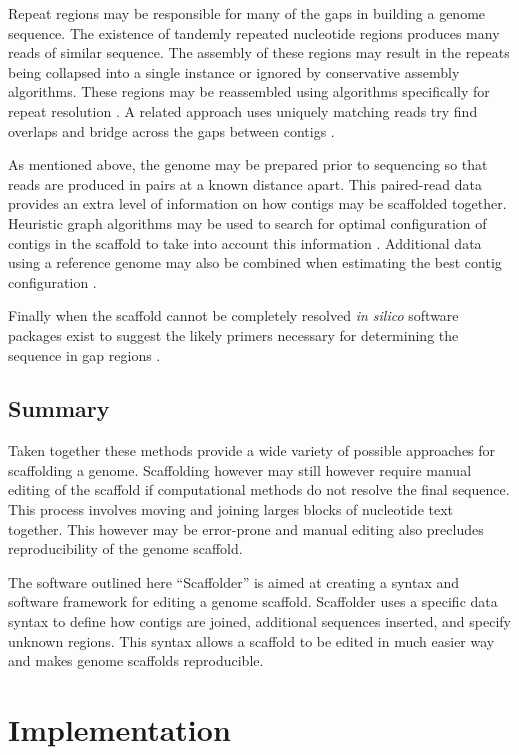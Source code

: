 \documentclass[10pt]{bmc_article}
\newenvironment{bmcformat}{\begin{raggedright}\baselineskip20pt\sloppy\setboolean{publ}{false}}{\end{raggedright}\baselineskip20pt\sloppy}
\begin{document}
\begin{bmcformat}
Repeat regions may be responsible for many of the gaps in building a genome
sequence. The existence of tandemly repeated nucleotide regions produces many
reads of similar sequence. The assembly of these regions may result in the
repeats being collapsed into a single instance or ignored by conservative
assembly algorithms. These regions may be reassembled using algorithms
specifically for repeat resolution \cite{mulyukov2002,koren2010}. A related
approach uses uniquely matching reads try find overlaps and bridge across the
gaps between contigs \cite{tsai2010}. \pb

As mentioned above, the genome may be prepared prior to sequencing so that
reads are produced in pairs at a known distance apart. This paired-read data
provides an extra level of information on how contigs may be scaffolded
together. Heuristic graph algorithms may be used to search for optimal
configuration of contigs in the scaffold to take into account this information
\cite{dayarian2010}. Additional data using a reference genome may also be
combined when estimating the best contig configuration \cite{pop2004}. \pb

Finally when the scaffold cannot be completely resolved \emph{in silico}
software packages exist to suggest the likely primers necessary for determining
the sequence in gap regions \cite{gordon2001,nagarajan2010}. \pb

\subsection*{Summary} %

Taken together these methods provide a wide variety of possible approaches for
scaffolding a genome. Scaffolding however may still however require manual
editing of the scaffold if computational methods do not resolve the final
sequence.  This process involves moving and joining larges blocks of nucleotide
text together. This however may be error-prone and manual editing also
precludes reproducibility of the genome scaffold. \pb

The software outlined here ``Scaffolder'' is aimed at creating a syntax and
software framework for editing a genome scaffold. Scaffolder uses a specific
data syntax to define how contigs are joined, additional sequences inserted,
and specify unknown regions. This syntax allows a scaffold to be edited in much
easier way and makes genome scaffolds reproducible. \pb

\clearpage

\section*{Implementation} %


\end{bmcformat}
\end{document}
